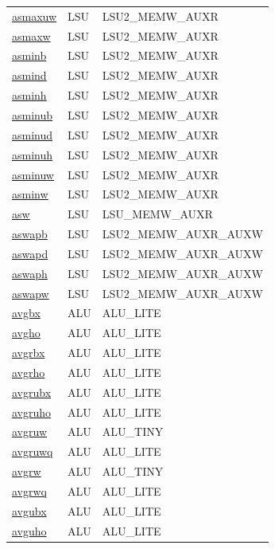 \begin{small}
\begin{longtable}[l]{l l l}
\hyperlink{lvx.asmaxuw}{asmaxuw} & LSU & LSU2\_MEMW\_AUXR \\ 
\hyperlink{lvx.asmaxw}{asmaxw} & LSU & LSU2\_MEMW\_AUXR \\ 
\hyperlink{lvx.asminb}{asminb} & LSU & LSU2\_MEMW\_AUXR \\ 
\hyperlink{lvx.asmind}{asmind} & LSU & LSU2\_MEMW\_AUXR \\ 
\hyperlink{lvx.asminh}{asminh} & LSU & LSU2\_MEMW\_AUXR \\ 
\hyperlink{lvx.asminub}{asminub} & LSU & LSU2\_MEMW\_AUXR \\ 
\hyperlink{lvx.asminud}{asminud} & LSU & LSU2\_MEMW\_AUXR \\ 
\hyperlink{lvx.asminuh}{asminuh} & LSU & LSU2\_MEMW\_AUXR \\ 
\hyperlink{lvx.asminuw}{asminuw} & LSU & LSU2\_MEMW\_AUXR \\ 
\hyperlink{lvx.asminw}{asminw} & LSU & LSU2\_MEMW\_AUXR \\ 
\hyperlink{lvx.asw}{asw} & LSU & LSU\_MEMW\_AUXR \\ 
\hyperlink{lvx.aswapb}{aswapb} & LSU & LSU2\_MEMW\_AUXR\_AUXW \\ 
\hyperlink{lvx.aswapd}{aswapd} & LSU & LSU2\_MEMW\_AUXR\_AUXW \\ 
\hyperlink{lvx.aswaph}{aswaph} & LSU & LSU2\_MEMW\_AUXR\_AUXW \\ 
\hyperlink{lvx.aswapw}{aswapw} & LSU & LSU2\_MEMW\_AUXR\_AUXW \\ 
\hyperlink{lvx.avgbx}{avgbx} & ALU & ALU\_LITE \\ 
\hyperlink{lvx.avgho}{avgho} & ALU & ALU\_LITE \\ 
\hyperlink{lvx.avgrbx}{avgrbx} & ALU & ALU\_LITE \\ 
\hyperlink{lvx.avgrho}{avgrho} & ALU & ALU\_LITE \\ 
\hyperlink{lvx.avgrubx}{avgrubx} & ALU & ALU\_LITE \\ 
\hyperlink{lvx.avgruho}{avgruho} & ALU & ALU\_LITE \\ 
\hyperlink{lvx.avgruw}{avgruw} & ALU & ALU\_TINY \\ 
\hyperlink{lvx.avgruwq}{avgruwq} & ALU & ALU\_LITE \\ 
\hyperlink{lvx.avgrw}{avgrw} & ALU & ALU\_TINY \\ 
\hyperlink{lvx.avgrwq}{avgrwq} & ALU & ALU\_LITE \\ 
\hyperlink{lvx.avgubx}{avgubx} & ALU & ALU\_LITE \\ 
\hyperlink{lvx.avguho}{avguho} & ALU & ALU\_LITE \\ 

\end{longtable}
\end{small}
